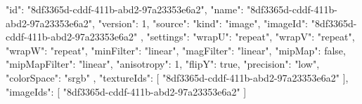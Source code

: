 {
  "id": "8df3365d-cddf-411b-abd2-97a23353e6a2",
  "name": "8df3365d-cddf-411b-abd2-97a23353e6a2",
  "version": 1,
  "source": {
    "kind": "image",
    "imageId": "8df3365d-cddf-411b-abd2-97a23353e6a2"
  },
  "settings": {
    "wrapU": "repeat",
    "wrapV": "repeat",
    "wrapW": "repeat",
    "minFilter": "linear",
    "magFilter": "linear",
    "mipMap": false,
    "mipMapFilter": "linear",
    "anisotropy": 1,
    "flipY": true,
    "precision": "low",
    "colorSpace": "srgb"
  },
  "textureIds": [
    "8df3365d-cddf-411b-abd2-97a23353e6a2"
  ],
  "imageIds": [
    "8df3365d-cddf-411b-abd2-97a23353e6a2"
  ]
}
